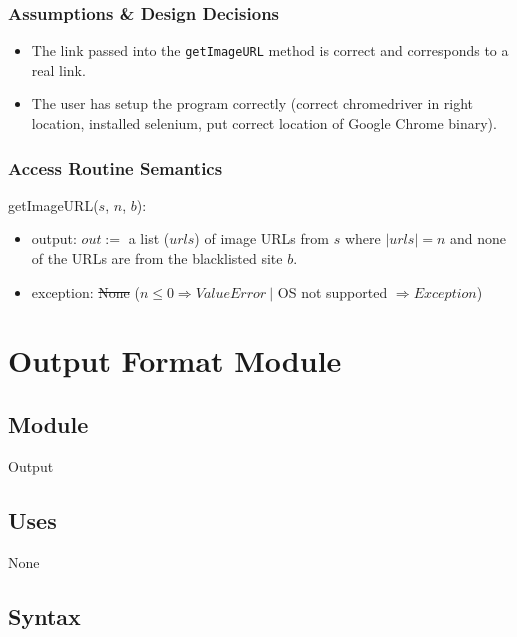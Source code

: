 \documentclass{article}
\begin{document}
\subsubsection* {Assumptions \& Design Decisions}

\begin{itemize}
\item The link passed into the \texttt{getImageURL} method is correct and corresponds to a real link.
\item The user has setup the program correctly (correct chromedriver in right location, installed selenium, put correct location of Google Chrome binary).

\end{itemize}

\subsubsection* {Access Routine Semantics}

\noindent getImageURL($s$, $n$\color{red}, $b$\color{black}):
\begin{itemize}
\item output: $\mathit{out} :=$ a list ($urls$) of image URLs from $s$ where $\mathit{|urls| = n}$ \color{red}and none of the URLs are from the blacklisted site $b$\color{black}.
\item exception: \st{None} \color{red}($n \leq 0 \Rightarrow \mathit{ValueError} ~\vert$ OS not supported $\Rightarrow \mathit{Exception}$)\color{black}
\end{itemize}

\newpage

\section*{Output Format Module}

\subsection* {Module}

Output

\subsection* {Uses}

None

\subsection* {Syntax}
\end{document}
